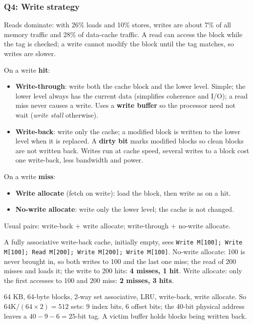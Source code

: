 \subsubsection{Q4: Write strategy}
Reads dominate: with 26\% loads and 10\% stores, writes are about 7\% of all
memory traffic and 28\% of data-cache traffic. A read can access the block while
the tag is checked; a write cannot modify the block until the tag matches, so
writes are slower.
\begin{definition}
On a write \textbf{hit}:
\begin{itemize}
  \item \textbf{Write-through}: write both the cache block and the lower level.
  Simple; the lower level always has the current data (simplifies coherence and
  I/O); a read miss never causes a write. Uses a \textbf{write buffer} so the
  processor need not wait (\emph{write stall} otherwise).
  \item \textbf{Write-back}: write only the cache; a modified block is written to
  the lower level when it is replaced. A \textbf{dirty bit} marks modified blocks so
  clean blocks are not written back. Writes run at cache speed, several writes to
  a block cost one write-back, less bandwidth and power.
\end{itemize}
On a write \textbf{miss}:
\begin{itemize}
  \item \textbf{Write allocate} (fetch on write): load the block, then write as on
  a hit.
  \item \textbf{No-write allocate}: write only the lower level; the cache is not
  changed.
\end{itemize}
Usual pairs: write-back $+$ write allocate; write-through $+$ no-write
allocate.
\end{definition}

\begin{eg}
A fully associative write-back cache, initially empty, sees
\texttt{Write M[100]; Write M[100]; Read M[200]; Write M[200]; Write M[100]}.
No-write allocate: 100 is never brought in, so both writes to 100 and the last
one miss; the read of 200 misses and loads it; the write to 200 hits: \textbf{4
misses, 1 hit}. Write allocate: only the first accesses to 100 and 200 miss:
\textbf{2 misses, 3 hits}.
\end{eg}

\begin{eg}
64 KB, 64-byte blocks, 2-way set associative, LRU, write-back, write allocate. So
$64\text{K}/(64\times2)=512$ sets: 9 index bits, 6 offset bits; the 40-bit
physical address leaves a $40-9-6=25$-bit tag. A victim buffer holds blocks being
written back.
\end{eg}

